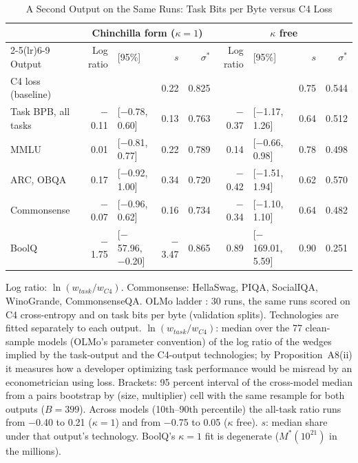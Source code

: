 \begin{table}[tp]
\centering
\caption{A Second Output on the Same Runs: Task Bits per Byte versus C4 Loss}
\label{tab:app-second-output}
\footnotesize
\setlength{\tabcolsep}{2.5pt}
\begin{tabular}{@{}lrlrrrlrr@{}}
\toprule
& \multicolumn{4}{c}{Chinchilla form ($\kappa=1$)} & \multicolumn{4}{c}{$\kappa$ free} \\
\cmidrule(lr){2-5}\cmidrule(lr){6-9}
Output & Log ratio & {\scriptsize[95\%]} & $s$ & $\sigma^*$ & Log ratio & {\scriptsize[95\%]} & $s$ & $\sigma^*$ \\
\midrule
C4 loss (baseline) & & & 0.22 & 0.825 & & & 0.75 & 0.544 \\
Task BPB, all tasks & $-$0.11 & {\scriptsize[$-$0.78, 0.60]} & 0.13 & 0.763 & $-$0.37 & {\scriptsize[$-$1.17, 1.26]} & 0.64 & 0.512 \\
\quad MMLU & 0.01 & {\scriptsize[$-$0.81, 0.77]} & 0.22 & 0.789 & 0.14 & {\scriptsize[$-$0.66, 0.98]} & 0.78 & 0.498 \\
\quad ARC, OBQA & 0.17 & {\scriptsize[$-$0.92, 1.00]} & 0.34 & 0.720 & $-$0.42 & {\scriptsize[$-$1.51, 1.94]} & 0.62 & 0.570 \\
\quad Commonsense & $-$0.07 & {\scriptsize[$-$0.96, 0.62]} & 0.16 & 0.734 & $-$0.34 & {\scriptsize[$-$1.10, 1.10]} & 0.64 & 0.482 \\
\quad BoolQ & $-$1.75 & {\scriptsize[$-$57.96, $-$0.20]} & $-$3.47 & 0.865 & 0.89 & {\scriptsize[$-$169.01, 5.59]} & 0.90 & 0.251 \\
\bottomrule
\end{tabular}
\medskip
\begin{tablenotes}
Log ratio: $\ln(w_{task}/w_{C4})$. Commonsense: HellaSwag, PIQA, SocialIQA, WinoGrande, CommonsenseQA. OLMo ladder \citep{bhagia2024establishing}: 30 runs, the same runs scored on C4 cross-entropy and on task bits per byte (validation splits). Technologies are fitted separately to each output. $\ln(w_{task}/w_{C4})$: median over the 77 clean-sample models (OLMo's parameter convention) of the log ratio of the wedges implied by the task-output and the C4-output technologies; by Proposition~A8(ii) it measures how a developer optimizing task performance would be misread by an econometrician using loss. Brackets: 95 percent interval of the cross-model median from a pairs bootstrap by (size, multiplier) cell with the same resample for both outputs ($B=399$). Across models (10th--90th percentile) the all-task ratio runs from $-$0.40 to 0.21 ($\kappa=1$) and from $-$0.75 to 0.05 ($\kappa$ free). $s$: median share under that output's technology. BoolQ's $\kappa=1$ fit is degenerate ($M^*(10^{21})$ in the millions).
\end{tablenotes}
\end{table}
